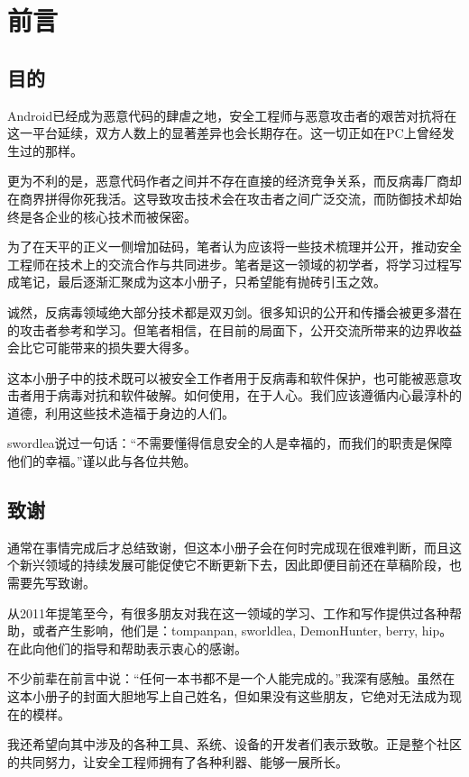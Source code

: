 \chapter{前言}
\section*{目的}
Android已经成为恶意代码的肆虐之地，安全工程师与恶意攻击者的艰苦对抗将在这一平台延续，双方人数上的显著差异也会长期存在。这一切正如在PC上曾经发生过的那样。

更为不利的是，恶意代码作者之间并不存在直接的经济竞争关系，而反病毒厂商却在商界拼得你死我活。这导致攻击技术会在攻击者之间广泛交流，而防御技术却始终是各企业的核心技术而被保密。

为了在天平的正义一侧增加砝码，笔者认为应该将一些技术梳理并公开，推动安全工程师在技术上的交流合作与共同进步。笔者是这一领域的初学者，将学习过程写成笔记，最后逐渐汇聚成为这本小册子，只希望能有抛砖引玉之效。

诚然，反病毒领域绝大部分技术都是双刃剑。很多知识的公开和传播会被更多潜在的攻击者参考和学习。但笔者相信，在目前的局面下，公开交流所带来的边界收益会比它可能带来的损失要大得多。

这本小册子中的技术既可以被安全工作者用于反病毒和软件保护，也可能被恶意攻击者用于病毒对抗和软件破解。如何使用，在于人心。我们应该遵循内心最淳朴的道德，利用这些技术造福于身边的人们。

swordlea说过一句话：“不需要懂得信息安全的人是幸福的，而我们的职责是保障他们的幸福。”谨以此与各位共勉。

\section*{致谢}
通常在事情完成后才总结致谢，但这本小册子会在何时完成现在很难判断，而且这个新兴领域的持续发展可能促使它不断更新下去，因此即便目前还在草稿阶段，也需要先写致谢。

从2011年提笔至今，有很多朋友对我在这一领域的学习、工作和写作提供过各种帮助，或者产生影响，他们是：tompanpan, sworldlea, DemonHunter, berry, hip。在此向他们的指导和帮助表示衷心的感谢。

不少前辈在前言中说：“任何一本书都不是一个人能完成的。”我深有感触。虽然在这本小册子的封面大胆地写上自己姓名，但如果没有这些朋友，它绝对无法成为现在的模样。

我还希望向其中涉及的各种工具、系统、设备的开发者们表示致敬。正是整个社区的共同努力，让安全工程师拥有了各种利器、能够一展所长。

